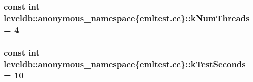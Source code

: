 \subsubsection[{k\+Num\+Threads}]{\setlength{\rightskip}{0pt plus 5cm}const int leveldb\+::anonymous\+\_\+namespace\{emltest.\+cc\}\+::k\+Num\+Threads = 4\hspace{0.3cm}{\ttfamily [static]}}\label{namespaceleveldb_1_1anonymous__namespace_02emltest_8cc_03_a26fa4b352f376c5bc4b01fdda6123d79}
\hypertarget{namespaceleveldb_1_1anonymous__namespace_02emltest_8cc_03_a6f62e4c714e736d0315cca1c1e1a3643}{}
\subsubsection[{k\+Test\+Seconds}]{\setlength{\rightskip}{0pt plus 5cm}const int leveldb\+::anonymous\+\_\+namespace\{emltest.\+cc\}\+::k\+Test\+Seconds = 10\hspace{0.3cm}{\ttfamily [static]}}\label{namespaceleveldb_1_1anonymous__namespace_02emltest_8cc_03_a6f62e4c714e736d0315cca1c1e1a3643}
